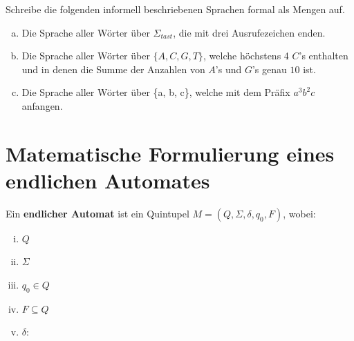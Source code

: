 \documentclass{article}
\begin{document}
\begin{exercise}
Schreibe die folgenden informell beschriebenen Sprachen formal als Mengen auf.


\begin{enumerate}[(a)]
    \item Die Sprache aller Wörter über \(\Sigma_{tast}\), die mit drei Ausrufezeichen enden.\\
    { 
    
    \blank[width=\linewidth]{}}

    \item Die Sprache aller Wörter über \(\{A, C, G, T\}\), welche höchstens 4 \(C\)'s enthalten und in denen die Summe der Anzahlen von \(A\)'s und \(G\)'s genau \(10\) ist. \\
    { 
    
    \blank[width=\linewidth]{}}
    
    \item Die Sprache aller Wörter über \{a, b, c\}, welche mit dem Präfix \(a^3 b^2 c\) anfangen. \\
    { 
    
    \blank[width=\linewidth]{}}
\end{enumerate}
\end{exercise}

\section{Matematische Formulierung eines endlichen Automates}
\begin{definition}[solution=true]
Ein \textbf{endlicher Automat} ist ein Quintupel \(M = (Q, \Sigma, \delta, q_0, F)\), wobei:
{ 
\begin{enumerate}[(i)]
    \item \(Q\) 
    \item \(\Sigma\) 
    \item \(q_0 \in Q\) 
    \item \(F \subseteq Q\) 
    \item \(\delta:\) 
\end{enumerate}
}
\end{definition}
\end{document}
